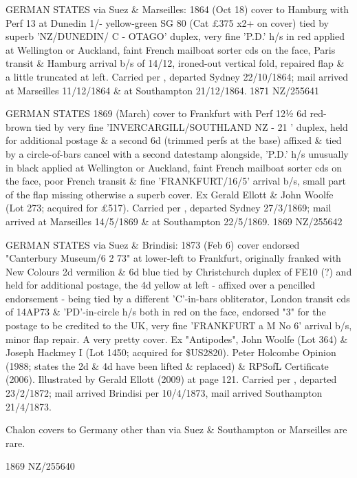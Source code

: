 \documentclass[justified]{tufte-book}
\begin{document}
%
{GERMAN STATES via Suez \& Marseilles: 1864 (Oct 18) cover to Hamburg with Perf 13 at Dunedin 1/- yellow-green SG 80 (Cat \pounds{375} x2+ on cover) tied by superb 'NZ/DUNEDIN/ C - OTAGO' duplex, very fine 'P.D.' h/s in red applied at Wellington or Auckland, faint French mailboat sorter cds on the face, Paris transit \& Hamburg arrival b/s of 14/12, ironed-out vertical fold, repaired flap \& a little truncated at left. Carried per , departed Sydney 22/10/1864; mail arrived at Marseilles 11/12/1864 \& at Southampton 21/12/1864.}%
{1871}%
{NZ/255641}%
{}%
{}
{}%
{}

%
{GERMAN STATES 1869 (March) cover to Frankfurt with Perf 12½ 6d red-brown tied by very fine 'INVERCARGILL/SOUTHLAND NZ - 21 ' duplex, held for additional postage \& a second 6d (trimmed perfs at the base) affixed \& tied by a circle-of-bars cancel with a second datestamp alongside, 'P.D.' h/s unusually in black applied at Wellington or Auckland, faint French mailboat sorter cds on the face, poor French transit \& fine 'FRANKFURT/16/5' arrival b/s, small part of the flap missing otherwise a superb cover. Ex Gerald Ellott \& John Woolfe (Lot 273; acquired for £517). Carried per , departed Sydney 27/3/1869; mail arrived at Marseilles 14/5/1869 \& at Southampton 22/5/1869.}%
{1869}%
{NZ/255642}%
{}%
{}
{}%
{}

%
{GERMAN STATES via Suez \& Brindisi: 1873 (Feb 6) cover endorsed "Canterbury Museum/6 2 73" at lower-left to Frankfurt, originally franked with New Colours 2d vermilion \& 6d blue tied by Christchurch duplex of FE10 (?) and held for additional postage, the 4d yellow at left - affixed over a pencilled endorsement - being tied by a different 'C'-in-bars obliterator, London transit cds of 14AP73 \& 'PD'-in-circle h/s both in red on the face, endorsed "3" for the postage to be credited to the UK, very fine 'FRANKFURT a M No 6' arrival b/s, minor flap repair. A very pretty cover. Ex "Antipodes", John Woolfe (Lot 364) \& Joseph Hackmey I (Lot 1450; acquired for \$US2820). Peter Holcombe Opinion (1988; states the 2d \& 4d have been lifted \& replaced) \& RPSofL Certificate (2006). Illustrated by Gerald Ellott (2009) at page 121. Carried per , departed 23/2/1872; mail arrived Brindisi per  10/4/1873, mail arrived Southampton 21/4/1873.

Chalon covers to Germany other than via Suez \& Southampton or Marseilles are rare.}%
{1869}%
{NZ/255640}%
{}%
{}
{}%
{}
\end{document}
